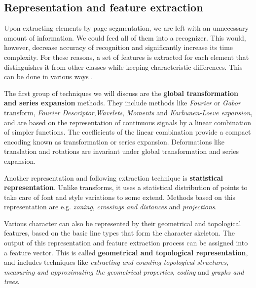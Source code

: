 \subsection{Representation and feature extraction}

Upon extracting elements by page segmentation, we are left with an unnecessary amount of information. We could feed all of them into a recognizer. This would, however, decrease accuracy of recognition and significantly increase its time complexity. For these reasons, a set of features is extracted for each element that distinguishes it from other classes while keeping characteristic differences. This can be done in various ways \citep{featureExtractionBook}.
\begin{description}

\item The first group of techniques we will discuss are the \textbf{global transformation and series expansion} methods. They include methods like \emph{Fourier} or \emph{Gabor} transform, \emph{Fourier Descriptor},\emph{Wavelets}, \emph{Moments} and \emph{Karhunen-Loeve expansion}, and are based on the representation of continuous signals by a linear combination of simpler functions. The coefficients of the linear combination provide a compact encoding known as transformation or series expansion. Deformations like translation and rotations are invariant under global transformation and series expansion.

\item Another representation and following extraction technique is \textbf{statistical representation}. Unlike transforms, it uses a statistical distribution of points to take care of font and style variations to some extend. Methods based on this representation are e.g. \emph{zoning}, \emph{crossings and distances} and \emph{projections}.

\item Various character can also be represented by their geometrical and topological features, based on the basic line types that form the character skeleton. The output of this representation and feature extraction process can be assigned into a feature vector.
This is called \textbf{geometrical and topological representation}, and includes techniques like \emph{extracting and counting topological structures}, \emph{measuring and approximating the geometrical properties}, \emph{coding} and \emph{graphs and trees}.

\end{description}

